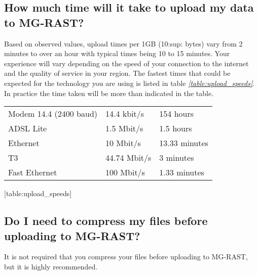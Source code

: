 \documentclass[letterpaper,10pt,english]{sphinxmanual}
\begin{document}
\subsection{How much time will it take to upload my data to MG-RAST?}
\label{\detokenize{user_manual:how-much-time-will-it-take-to-upload-my-data-to-mg-rast}}
Based on observed values, upload times per 1GB (10:sup: bytes) vary
from 2 minutes to over an hour with typical times being 10 to 15
minutes. Your experience will vary depending on the speed of your
connection to the internet and the quality of service in your region.
The fastest times that could be expected for the technology you are
using is listed in table
{\hyperref[\detokenize{user_manual:table:upload_speeds}]{\emph{{[}table:upload\_speeds{]}}}}. In practice the time
taken will be more than indicated in the table.


\begin{savenotes}\sphinxattablestart
\centering
{}
\sphinxthecaptionisattop
{}\label{\detokenize{user_manual:id17}}
\sphinxaftertopcaption
\begin{tabulary}{\linewidth}[t]{|T|T|T|}
\hline
\sphinxstyletheadfamily 
{}
&\sphinxstyletheadfamily 
{}
&\sphinxstyletheadfamily 
{}
\\
\hline
Modem 14.4 (2400 baud)
&
14.4 kbit/s
&
154 hours
\\
\hline
ADSL Lite
&
1.5 Mbit/s
&
1.5 hours
\\
\hline
Ethernet
&
10 Mbit/s
&
13.33 minutes
\\
\hline
T3
&
44.74 Mbit/s
&
3 minutes
\\
\hline
Fast Ethernet
&
100 Mbit/s
&
1.33 minutes
\\
\hline
\end{tabulary}
\par
\sphinxattableend\end{savenotes}

{[}table:upload\_speeds{]}


\subsection{Do I need to compress my files before uploading to MG-RAST?}
\label{\detokenize{user_manual:do-i-need-to-compress-my-files-before-uploading-to-mg-rast}}
It is not required that you compress your files before uploading to
MG-RAST, but it is highly recommended.
\end{document}
